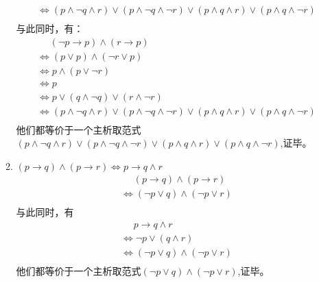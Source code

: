 \documentclass[UTF8]{ctexart}
\begin{document}
\begin{enumerate}
\begin{enumerate}
\[\begin{aligned}
               &\Leftrightarrow (p \wedge \neg q \wedge r)\vee(p\wedge \neg q \wedge \neg r)\vee(p \wedge q \wedge r)\vee(p\wedge q\wedge \neg r)\\
            \end{aligned}
         \]
         与此同时，有：
         \[
            \begin{aligned}
               &\mathrel{\phantom{=}}(\neg p \rightarrow  p) \wedge  (r \rightarrow  p)\\
               &\Leftrightarrow (p\vee p)\wedge (\neg r \vee p)\\
               &\Leftrightarrow p\wedge (p\vee \neg r)\\
               &\Leftrightarrow p\\
               &\Leftrightarrow p\vee(q \wedge \neg q)\vee(r\wedge \neg r)\\
               &\Leftrightarrow (p \wedge \neg q \wedge r)\vee(p\wedge \neg q \wedge \neg r)\vee(p \wedge q \wedge r)\vee(p\wedge q\wedge \neg r)\\
            \end{aligned}
         \]
         他们都等价于一个主析取范式$(p \wedge \neg q \wedge r)\vee(p\wedge \neg q \wedge \neg r)\vee(p \wedge q \wedge r)\vee(p\wedge q\wedge \neg r)$,证毕。
         \item $( p \rightarrow  q) \wedge  ( p \rightarrow  r) \Leftrightarrow  p \rightarrow  q \wedge  r$
         \[
            \begin{aligned}
               &\mathrel{\phantom{=}}( p \rightarrow  q) \wedge  ( p \rightarrow  r)\\
               &\Leftrightarrow (\neg p \vee q)\wedge (\neg p \vee r)\\
            \end{aligned}
         \]
         与此同时，有
         \[
            \begin{aligned}
               &\mathrel{\phantom{=}}p \rightarrow  q \wedge  r\\
               &\Leftrightarrow \neg p \vee(q\wedge r)\\
               &\Leftrightarrow (\neg p \vee q)\wedge (\neg p \vee r)\\
            \end{aligned}
         \]
         他们都等价于一个主析取范式$(\neg p \vee q)\wedge (\neg p \vee r)$,证毕。
      \end{enumerate}
      
      
      
     
   \end{enumerate}
   
\end{document}
